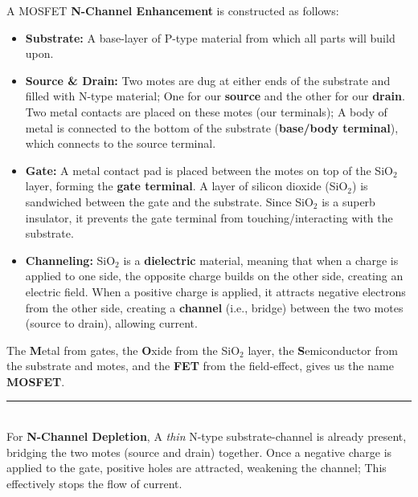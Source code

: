 \begin{Def}

    \label{def:mosfet}

    A MOSFET \textbf{N-Channel Enhancement} is constructed as follows:
    \begin{itemize}
      \item \textbf{Substrate:} A base-layer of P-type material from which all parts will build upon.
      \item \textbf{Source \& Drain:} Two motes are dug at either ends of the substrate and filled with N-type material;
      One for our \textbf{source} and the other for our \textbf{drain}. Two metal contacts are placed on these motes (our terminals);
      A body of metal is connected to the bottom of the substrate (\textbf{base/body terminal}), which connects to the source terminal.
      \item \textbf{Gate:} A metal contact pad is placed between the motes on top of the SiO$_2$ layer, forming the \textbf{gate terminal}.
      A layer of silicon dioxide (SiO$_2$) is sandwiched between the gate and the substrate.
      Since SiO$_2$ is a superb insulator, it prevents the gate terminal from touching/interacting with the substrate.
      \item \textbf{Channeling:} SiO$_2$ is a \textbf{dielectric} material, meaning that when a charge is applied to one side, the opposite charge builds on the other side,
      creating an electric field. When a positive charge is applied, it attracts negative electrons from the other side, creating a \textbf{channel} (i.e., bridge)
      between the two motes (source to drain), allowing current.
    \end{itemize}
    
    \noindent
    The \textbf{M}etal from gates, the \textbf{O}xide from the SiO$_2$ layer, the \textbf{S}emiconductor from the substrate and motes, and 
    the \textbf{FET} from the field-effect, gives us the name \textbf{MOSFET}.

    \noindent
    \rule{\textwidth}{0.4pt}\\
    \noindent
    For \textbf{N-Channel Depletion}, A \emph{thin} N-type substrate-channel is already present, bridging the two motes (source and drain) together.
    Once a negative charge is applied to the gate, positive holes are attracted, weakening the channel; This effectively stops the flow of current.
\end{Def}

